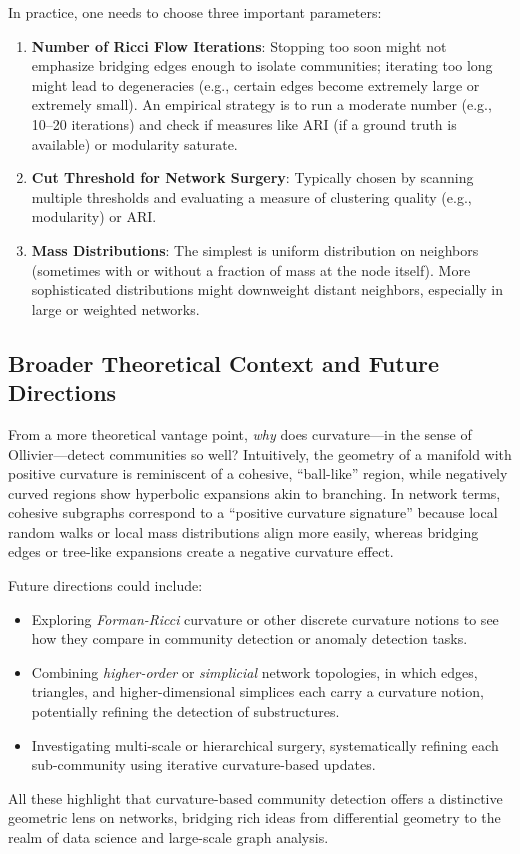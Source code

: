 In practice, one needs to choose three important parameters:
\begin{enumerate}
    \item \textbf{Number of Ricci Flow Iterations}: Stopping too soon might not emphasize bridging edges enough to isolate communities; iterating too long might lead to degeneracies (e.g., certain edges become extremely large or extremely small). An empirical strategy is to run a moderate number (e.g., 10--20 iterations) and check if measures like ARI (if a ground truth is available) or modularity saturate.
    \item \textbf{Cut Threshold for Network Surgery}: Typically chosen by scanning multiple thresholds and evaluating a measure of clustering quality (e.g., modularity) or ARI. 
    \item \textbf{Mass Distributions}: The simplest is uniform distribution on neighbors (sometimes with or without a fraction of mass at the node itself). More sophisticated distributions might downweight distant neighbors, especially in large or weighted networks.
\end{enumerate}

\subsection{Broader Theoretical Context and Future Directions}
From a more theoretical vantage point, \emph{why} does curvature---in the sense of Ollivier---detect communities so well? Intuitively, the geometry of a manifold with positive curvature is reminiscent of a cohesive, ``ball-like'' region, while negatively curved regions show hyperbolic expansions akin to branching. In network terms, cohesive subgraphs correspond to a “positive curvature signature” because local random walks or local mass distributions align more easily, whereas bridging edges or tree-like expansions create a negative curvature effect. 

Future directions could include:
\begin{itemize}
    \item Exploring \emph{Forman-Ricci} curvature or other discrete curvature notions to see how they compare in community detection or anomaly detection tasks.
    \item Combining \emph{higher-order} or \emph{simplicial} network topologies, in which edges, triangles, and higher-dimensional simplices each carry a curvature notion, potentially refining the detection of substructures.
    \item Investigating multi-scale or hierarchical surgery, systematically refining each sub-community using iterative curvature-based updates.
\end{itemize}

All these highlight that curvature-based community detection offers a distinctive geometric lens on networks, bridging rich ideas from differential geometry to the realm of data science and large-scale graph analysis.